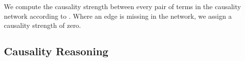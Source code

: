 

We compute the causality strength between every pair of terms in the 
causality network
according to . Where an edge is missing in the network,
we assign a causality strength of zero.

\subsection{Causality Reasoning}
\label{sec:reasoning}

